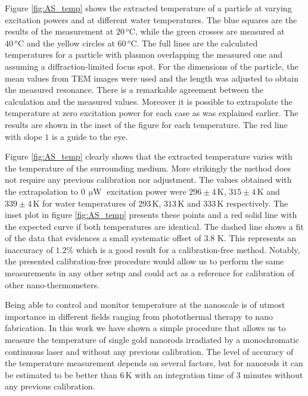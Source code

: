 \documentclass[journal=nalefd,manuscript=letter]{achemso}
\newcommand{\K}{\ensuremath{\,\textrm{K}}}
\newcommand{\uW}{\ensuremath{\,\upmu\textrm{W}}}
\newcommand{\degree}{\ensuremath{\,^o\textrm{C}}}
\begin{document}
Figure \ref{fig:AS_temp} shows the extracted temperature of a particle at
varying excitation powers and at different water temperatures. The blue squares
are the results of the measurement at $20\degree$, while the green crosses are measured
at $40\degree$ and the yellow circles at $60\degree$. The full lines are the
calculated temperatures for a particle with plasmon overlapping the measured one
and assuming a diffraction-limited focus spot. For the dimensions of the
particle, the mean values from TEM images were used and the length was adjusted
to obtain the measured resonance. There is a remarkable agreement between the
calculation and the measured values. Moreover it is possible to extrapolate the
temperature at zero excitation power for each case as was explained earlier. The
results are shown in the inset of the figure for each temperature. The red line
with slope $1$ is a guide to the eye.

Figure \ref{fig:AS_temp} clearly shows that the extracted temperature varies
with the temperature of the surrounding medium. More strikingly the method does
not require any previous calibration nor adjustment. The values obtained with
the extrapolation to $0\uW$ excitation power were $296 \pm 4\K$, $315\pm 4\K$
and $339 \pm 4\K$ for water temperatures of $293\K$, $313\K$ and $333\K$
respectively. The inset plot in figure \ref{fig:AS_temp} presents these points 
and a red solid line with the expected curve if both temperatures are identical. The 
dashed line shows a fit of the data that evidences a small systematic offset of $3.8\,\K$. This represents
an inaccuracy of $1.2\%$ which is a good result for a calibration-free method.
Notably, the presented calibration-free procedure would allow us to perform the same
measurements in any other setup and could act as a reference for calibration of
other nano-thermometers.


Being able to control and monitor temperature at the nanoscale is of utmost
importance in different fields ranging from photothermal therapy\cite{Huang2006}
to nano fabrication\cite{Fedoruk2013}. In this work we have shown a simple
procedure that allows us to measure the temperature of single gold nanorods
irradiated by a monochromatic continuous laser and without any previous
calibration. The level of accuracy of the temperature measurement depends on
several factors, but for nanorods it can be estimated to be better than $6\K$ 
with an integration time of $3$ minutes without any previous calibration.
\end{document}
